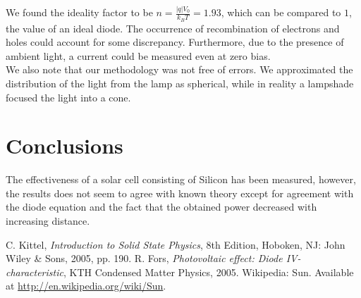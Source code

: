 \documentclass[12pt,a4paper]{article}
\begin{document}
We found the ideality factor to be $n = \frac{|q|V_0}{k_BT} = 1.93$, which can be compared to $1$, the value of an ideal diode. The occurrence of recombination of electrons and holes could account for some discrepancy. Furthermore, due to the presence of ambient light, a current could be measured even at zero bias. \\

We also note that our methodology was not free of errors. We approximated the distribution of the light from the lamp as spherical, while in reality a lampshade focused the light into a cone.

\section{Conclusions}
The effectiveness of a solar cell consisting of Silicon has been measured, however, the results does not seem to agree with known theory except for agreement with the diode equation and the fact that the obtained power decreased with increasing distance.

\begin{thebibliography}{9}
 C. Kittel, \emph{Introduction to Solid State Physics}, 8th Edition, Hoboken, NJ: John Wiley \& Sons, 2005, pp. 190.
 R. Fors, \emph{Photovoltaic effect: Diode IV-characteristic}, KTH Condensed Matter Physics, 2005.
 Wikipedia: Sun. Available at \url{http://en.wikipedia.org/wiki/Sun}.
\end{thebibliography}
\end{document}

